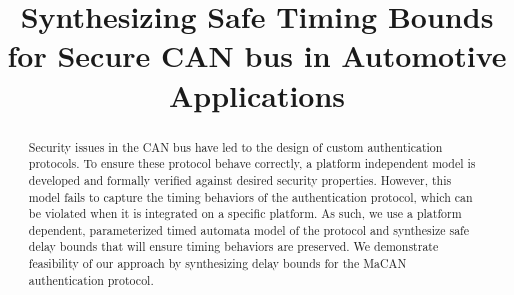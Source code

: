 \documentclass[sigconf]{acmart}
\begin{document}
\title{Synthesizing Safe Timing Bounds for Secure CAN bus in Automotive Applications}


\author{} %



\renewcommand{\shortauthors}{}


\begin{abstract}
Security issues in the CAN bus have led to the design of custom authentication protocols. To ensure these protocol behave correctly, a platform independent model is developed and formally verified against desired security properties. However, this model fails to capture the timing behaviors of the authentication protocol, which can be violated when it is integrated on a specific platform. As such, we use a platform dependent, parameterized timed automata model of the protocol and synthesize safe delay bounds that will ensure timing behaviors are preserved. We demonstrate feasibility of our approach by synthesizing delay bounds for the MaCAN authentication protocol.           





\end{abstract}
\end{document}
